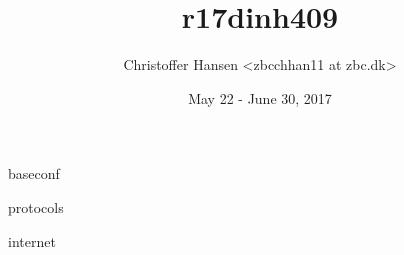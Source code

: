 \documentclass[a4paper,12pt,twoside,twocolumn,landscape]{book}
\begin{document}
\title{r17dinh409}
\author{Christoffer Hansen <zbcchhan11 at zbc.dk>}
\date{May 22 - June 30, 2017}

\maketitle

\tableofcontents

\setlength{\parskip}{0.35em} %
\renewcommand{\baselinestretch}{1.15} %


{baseconf}

{protocols}

{internet}


\renewcommand{\listfigurename}{List of {\footnotesize hidden} Figures}
\listoffigures


\renewcommand{\listtablename}{Tables {\footnotesize hidding} on the pages}
\listoftables





\end{document}
